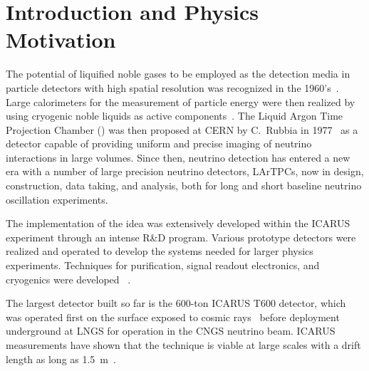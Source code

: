 \section{Introduction and Physics Motivation}

The potential of liquified noble gases to be employed as the detection media in particle detectors with high spatial resolution was recognized in the 1960's~\cite{Doke:1993}. Large calorimeters for the measurement of particle energy were then realized by using cryogenic noble liquids as active components~\cite{Willis:1974}.  The Liquid Argon Time Projection Chamber (\lartpc) was then proposed at CERN by C.~Rubbia in 1977~\cite{Rubbia:1977} as a detector capable of providing uniform and precise imaging of neutrino interactions in large volumes.   Since then, neutrino detection has entered a new era with a number of large precision neutrino detectors, LArTPCs, now in design, construction, data taking, and analysis, both for long and short baseline neutrino oscillation experiments.  

The implementation of the \lartpc idea was extensively developed within the ICARUS experiment through an intense R\&D program. Various prototype detectors were realized and operated to develop the systems needed for larger physics experiments.  Techniques for purification, signal readout electronics, and cryogenics were developed ~\cite{Benetti:1993-3ton,Cennini:1994-3ton,Arneodo:1999-50l}. 

The largest \lartpc detector built so far is the 600-ton ICARUS T600 detector, which was operated first on the surface exposed to cosmic rays~\cite{Amerio:2004-T600} before deployment underground at LNGS for operation in the CNGS neutrino beam.  ICARUS measurements have shown that the technique is viable at large scales with a drift length as long as 1.5~m~\cite{Amoruso:2004-muon,Amoruso:2004-electron,Antonello:2004-cherenkov,Amoruso:2004-purity,Arneodo:2003-tracks}.  


